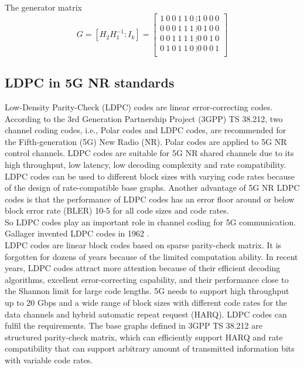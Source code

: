 The generator matrix
\[G = [H_2 H_{1}^{-1} : I_k ] =\left[\begin{matrix}1\ 0\ 0\ 1\ 1\ 0\ \vdots1\ 0\ 0\ 0\\0\ 0\ 0\ 1\ 1\ 1\ \vdots0\ 1\ 0\ 0\\0\ 0\ 1\ 1\ 1\ 1\ \vdots0\ 0\ 1\ 0\\0\ 1\ 0\ 1\ 1\ 0\ \vdots0\ 0\ 0\ 1\\\end{matrix}\right] \]

\subsection{LDPC in 5G NR standards} 
Low-Density Parity-Check (LDPC) codes are linear error-correcting codes. According to the 3rd Generation Partnership Project (3GPP) TS 38.212, two channel coding codes, i.e., Polar codes and LDPC codes, are recommended for the Fifth-generation (5G) New Radio (NR). Polar codes are applied to 5G NR control channels. LDPC codes are suitable for 5G NR shared channels due to its high throughput, low latency, low decoding complexity and rate compatibility. \\
LDPC codes can be used to different block sizes with varying code rates because of the design of rate-compatible base graphs. Another advantage of 5G NR LDPC codes is that the performance of LDPC codes has an error floor around or below block error rate (BLER) 10-5 for all code sizes and code rates. \\
So LDPC codes play an important role in channel coding for 5G communication. Gallager invented LDPC codes in 1962 . \\
LDPC codes are linear block codes based on sparse parity-check matrix. It is forgotten for dozens of years because of the limited computation ability. In recent years, LDPC codes attract more attention because of their efficient decoding algorithms, excellent error-correcting capability, and their performance close to the Shannon limit for large code lengths. 5G needs to support high throughput up to 20 Gbps and a wide range of block sizes with different code rates for the data channels and hybrid automatic repeat request (HARQ). LDPC codes can fulfil the requirements. The base graphs defined in 3GPP TS 38.212 are structured parity-check matrix, which can efficiently support HARQ and rate compatibility that can support arbitrary amount of transmitted information bits with variable code rates. \\

